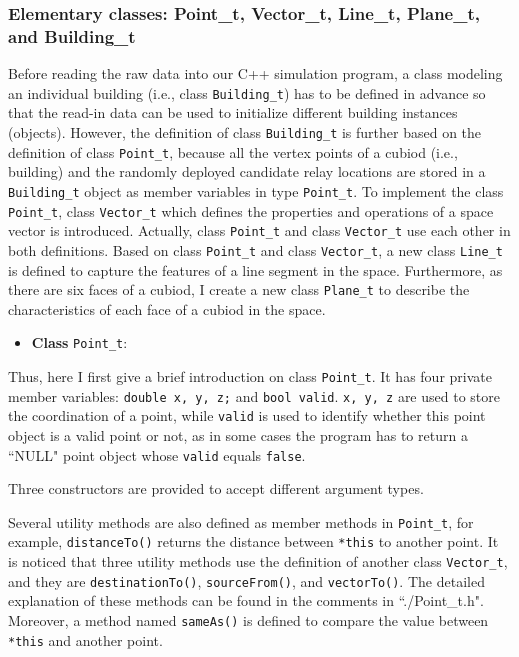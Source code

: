 \documentclass[paper=a4, fontsize=11pt]{scrartcl}
\numberwithin{equation}{section}		%
\numberwithin{figure}{section}			%
\numberwithin{table}{section}				%
\begin{document}
\subsubsection{Elementary classes: Point\_t, Vector\_t, Line\_t, Plane\_t, and Building\_t}
Before reading the raw data into our C++ simulation program, a class modeling an individual building (i.e., class \verb|Building_t|) has to be defined in advance so that the read-in data can be used to initialize different building instances (objects). However, the definition of class \verb|Building_t| is further based on the definition of class \verb|Point_t|, because all the vertex points of a cubiod (i.e., building) and the randomly deployed candidate relay locations are stored in a \verb|Building_t| object as member variables in type \verb|Point_t|. To implement the class \verb|Point_t|, class \verb|Vector_t| which defines the properties and operations of a space vector is introduced. Actually, class \verb|Point_t| and class \verb|Vector_t| use each other in both definitions. Based on class \verb|Point_t| and class \verb|Vector_t|, a new class \verb|Line_t| is defined to capture the features of a line segment in the space. Furthermore, as there are six faces of a cubiod, I create a new class \verb|Plane_t| to describe the characteristics of each face of a cubiod in the space.  

\begin{itemize}
	\item \textbf{Class} \verb|Point_t|:
\end{itemize}

Thus, here I first give a brief introduction on class \verb|Point_t|. It has four private member variables: \verb|double x, y, z;| and \verb|bool valid|. \verb|x, y, z| are used to store the coordination of a point, while \verb|valid| is used to identify whether this point object is a valid point or not, as in some cases the program has to return a ``NULL" point object whose \verb|valid| equals \verb|false|. 

Three constructors are provided to accept different argument types. 

Several utility methods are also defined as member methods in \verb|Point_t|, for example, \verb|distanceTo()| returns the distance between \verb|*this| to another point. It is noticed that three utility methods use the definition of another class \verb|Vector_t|, and they are \verb|destinationTo()|, \verb|sourceFrom()|, and \verb|vectorTo()|. The detailed explanation of these methods can be found in the comments in ``./Point\_t.h". Moreover, a method named \verb|sameAs()| is defined to compare the value between \verb|*this| and another point.
\end{document}
